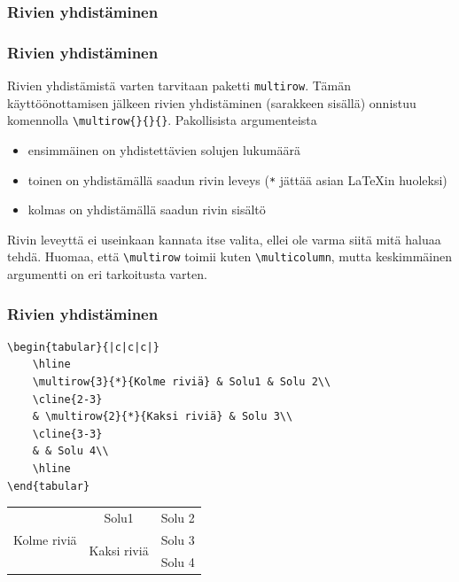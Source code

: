 \subsubsection{Rivien yhdistäminen}
\begin{frame}[fragile]
    \frametitle{Rivien yhdistäminen}
    Rivien yhdistämistä varten tarvitaan paketti \verb-multirow-. Tämän käyttöönottamisen jälkeen rivien yhdistäminen (sarakkeen sisällä) onnistuu komennolla \verb-\multirow{}{}{}-. Pakollisista argumenteista
    \begin{itemize}
        \item ensimmäinen on yhdistettävien solujen lukumäärä
        \item toinen on yhdistämällä saadun rivin leveys (\verb-*- jättää asian \LaTeX in huoleksi)
        \item kolmas on yhdistämällä saadun rivin sisältö
    \end{itemize}
    Rivin leveyttä ei useinkaan kannata itse valita, ellei ole varma siitä mitä haluaa tehdä. 
    \vaihto
    Huomaa, että \verb-\multirow- toimii kuten \verb-\multicolumn-, mutta keskimmäinen argumentti on eri tarkoitusta varten.
\end{frame}
\begin{frame}[fragile]
    \frametitle{Rivien yhdistäminen} 
    \begin{scriptsize}
        \begin{Verbatim}[frame=single]
\begin{tabular}{|c|c|c|}
    \hline
    \multirow{3}{*}{Kolme riviä} & Solu1 & Solu 2\\
    \cline{2-3}
    & \multirow{2}{*}{Kaksi riviä} & Solu 3\\
    \cline{3-3}
    & & Solu 4\\
    \hline
\end{tabular}
        \end{Verbatim}
    \end{scriptsize}
    \begin{serif}
        \begin{tabular}{|c|c|c|}
            \hline
            \multirow{3}{*}{Kolme riviä} & Solu1	& Solu 2\\\cline{2-3}
                                          & \multirow{2}{*}{Kaksi riviä}	& Solu 3\\\cline{3-3}
                                          & & Solu 4\\
            \hline
        \end{tabular}
    \end{serif}
\end{frame}
